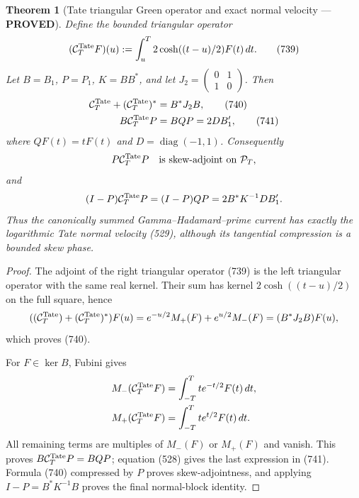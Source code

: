 \documentclass[11pt]{article}
\newtheorem{theorem}{Theorem}
\newcommand{\PROVED}{\textcolor{green!45!black}{\textbf{PROVED}}}
\begin{document}
\begin{theorem}[Tate triangular Green operator and exact normal velocity ---
\PROVED]
Define the bounded triangular operator
\begin{equation}
 (\mathcal C_T^{\rm Tate}F)(u)
 :=\int_u^T2\cosh((t-u)/2)F(t)\,dt.                 \tag{739}
\end{equation}
Let \(B=B_1\), \(P=P_1\), \(K=BB^*\), and let
\(J_2=\left(\begin{smallmatrix}0&1\\1&0\end{smallmatrix}\right)\).
Then
\begin{align}
 \mathcal C_T^{\rm Tate}
 +(\mathcal C_T^{\rm Tate})^*
 &=B^*J_2B,                                         \tag{740}\\
 B\mathcal C_T^{\rm Tate}P
 &=BQP=2DB_1',                                      \tag{741}
\end{align}
where \(QF(t)=tF(t)\) and \(D=\operatorname{diag}(-1,1)\).
Consequently
\[
 P\mathcal C_T^{\rm Tate}P
\quad\hbox{is skew-adjoint on }\mathcal P_T,
\]
and
\[
 (I-P)\mathcal C_T^{\rm Tate}P
 =(I-P)QP
 =2B^*K^{-1}DB_1'.
\]
Thus the canonically summed Gamma--Hadamard--prime current has exactly the
logarithmic Tate normal velocity (529), although its tangential compression
is a bounded skew phase.
\end{theorem}

\begin{proof}
The adjoint of the right triangular operator (739) is the left triangular
operator with the same real kernel.  Their sum has kernel
\(2\cosh((t-u)/2)\) on the full square, hence
\[
 ((\mathcal C_T^{\rm Tate})+
   (\mathcal C_T^{\rm Tate})^*)F(u)
 =e^{-u/2}M_+(F)+e^{u/2}M_-(F)
 =(B^*J_2B)F(u),
\]
which proves (740).

For \(F\in\ker B\), Fubini gives
\begin{align*}
 M_-(\mathcal C_T^{\rm Tate}F)
 &=\int_{-T}^Tte^{-t/2}F(t)\,dt,\\
 M_+(\mathcal C_T^{\rm Tate}F)
 &=\int_{-T}^Tte^{t/2}F(t)\,dt.
\end{align*}
All remaining terms are multiples of \(M_-(F)\) or \(M_+(F)\) and vanish.
This proves \(B\mathcal C_T^{\rm Tate}P=BQP\); equation (528) gives the
last expression in (741).  Formula (740) compressed by \(P\) proves
skew-adjointness, and applying
\(I-P=B^*K^{-1}B\) proves the final normal-block identity.
\end{proof}
\end{document}

